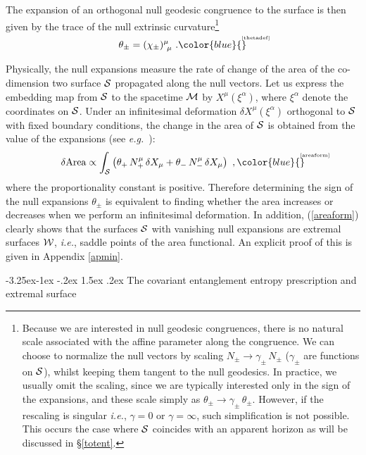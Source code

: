 \documentclass[12pt]{article}
\makeatletter
\renewcommand\subsection{\@startsection{subsection}{2}{\z@}%
                                     {-3.25ex\@plus -1ex \@minus -.2ex}%
                                     {1.5ex \@plus .2ex}%
                                     {\normalfont\bfseries}}
\newcommand{\be}{\begin{equation}}
\newcommand{\ee}{\end{equation}}
\def\sec#1{\S \;\ref{#1}}
\def\req#1{(\ref{#1})}
\def\App#1{Appendix \ref{#1}}
\def\eg{{\it e.g.}}
\def\ie{{\it i.e.}}
\def\CS{{\cal S}}
\def\CW{{\cal W}}
\def\Label#1{\label{#1}%
{ \color{blue}{\smash{\hbox to0pt{\raise2ex\hbox{\tiny[#1]}\hss}}}}}
\def\bulk{{\cal M}}
\def\ms{\CS}
\def\Gms{\CW}
\def\ap{\alpha}
\makeatother
\begin{document}
The expansion of an orthogonal null geodesic congruence to the
surface is then given by the trace of the null extrinsic
curvature\footnote{Because we are interested in null geodesic
congruences, there is no natural scale associated with the affine
parameter along the congruence.  We can choose to normalize the null
vectors by scaling $N_\pm \to \gamma_\pm\, N_\pm$  ($\gamma_\pm$ are
functions on $\ms$), whilst keeping them tangent to the null
geodesics. In practice, we usually omit the scaling, since we are
typically interested only in the sign of the expansions, and these
scale simply as $\theta_{\pm}\to \gamma_{\pm}\, \theta_{\pm}$.
However, if the rescaling is singular \ie, $\gamma=0$ or
$\gamma=\infty$, such simplification is not possible. This occurs
the case where $\ms$ coincides with an apparent horizon as will be
discussed in \sec{totent}.}
%
\begin{equation}
\theta_\pm = (\chi_\pm)_{\ \mu}^\mu \ .
\Label{thetadef}
\end{equation}
%

Physically, the null expansions measure the rate of change of the
area of the co-dimension two surface $\ms$
 propagated along the null vectors. Let us express
 the embedding map from $\ms$ to the spacetime $\bulk$ by
 $X^\mu(\xi^\ap)$, where $\xi^\ap$ denote the coordinates on $\ms$.
 Under an infinitesimal deformation $\delta X^\mu(\xi^\ap)$
orthogonal to $\ms$ with fixed boundary conditions,
the change in the area of $\ms$  is obtained from the value of
 the expansions (see \eg\ \cite{Senovilla:2004dc}):
%
\be \delta \mbox{Area}\propto
\int_{\ms} \left(\theta_+ \,  N_+^\mu \, \delta X_\mu +\theta_- \,
N_-^\mu \, \delta X_\mu\right) \ ,
\Label{areaform}
\ee
%
where the proportionality constant is positive. Therefore
determining the sign of the null expansions $\theta_\pm$ is
equivalent to finding whether the area increases or decreases when
we perform an infinitesimal deformation. In addition, \req{areaform}
clearly shows that the surfaces $\ms$ with vanishing null expansions
are extremal surfaces $\Gms$, \ie, saddle points of the area
functional. An explicit proof of this is given in \App{apmin}.


\subsection{The covariant entanglement entropy prescription and extremal surface}
\label{covls}
\end{document}
